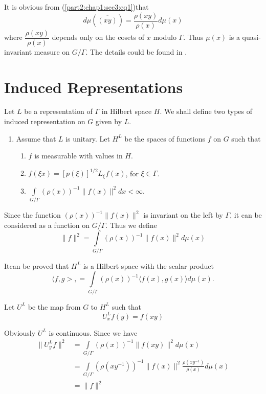 It is obvious from (\ref{part2:chap1:sec3:eq1})that                 
$$
d \mu (\overline{(xy)})=\frac{\rho(xy)}{\rho(x)} d \mu (x)
$$                
where $\dfrac {\rho(xy)}{\rho(x)}$ depends only on the cosets of $x$ modulo
$\Gamma$. Thus $\mu (x)$ is a quasi-invariant measure on
$G/\Gamma$. The details could be found in \cite{9}. 
                    
\section{Induced Representations}\label{part2:chap1:sec4}
                    
Let $L$ be a representation of $\Gamma$ in Hilbert space $H$. We shall
define two types of induced representation on $G$ given by $L$.  
\begin{enumerate}[(1)]
\item Assume that $L$ is unitary. Let $H^L$ be the spaces of functions
  $f$ on $G$ such that                                 
  \begin{enumerate}[(1)] 
  \item $f$ is measurable with values in $H$.
  \item $f(\xi x)=[p(\xi)]^{1/2} L_\xi f(x)$, for $\xi \in \Gamma$.
  \item $\underset {G/\Gamma}\int (\rho(x))^{-1} \parallel f(x)
    \parallel^2  dx < \infty$. 
  \end{enumerate}                     
\end{enumerate}

Since the function $(\rho(x))^{-1} \parallel f(x)\parallel ^2$ is
invariant on the left by $\Gamma$, it can be considered as a function
on $G/\Gamma$. Thus we define 
$$
\parallel f \parallel^2 =\underset {G/\Gamma} \int (\rho(x))^{-1}
\parallel f(x) \parallel^2 d \mu (x) 
$$

It\pageoriginale can be proved that $H^L$ is a Hilbert space with the scalar product  
$$
\langle f,g >, = \underset{G/\Gamma}\int (\rho(x))^{-1} \langle
f(x),g(x) \rangle d \mu (x). 
$$

Let $U^L$ be the map from $G$ to $H^L$ such that 
$$
U^L_x f(y)=f(xy)
$$ 

Obviously $U^L$ is continuous. Since we have 
\begin{align*}
  \parallel U^L_y f \parallel^2 &= \int\limits_{G/\Gamma} (\rho(x))^{-1}
  \parallel f(xy) \parallel^2 d\mu (x)\\ 
  &= \underset{G/\Gamma} \int (\rho(xy^{-1}))^{-1} \parallel f(x)
  \parallel^2 \frac{\rho(xy^{-1})}{\rho(x)} d \mu (x)\\ 
  &=\parallel f \parallel^2
\end{align*} 

